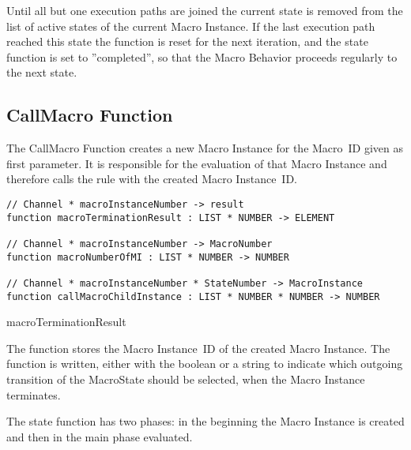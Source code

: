 Until all but one execution paths are joined the current state is removed from the list of active states of the current Macro Instance. If the last execution path reached this state the  function is reset for the next iteration, and the state function is set to ''completed'', so that the Macro Behavior proceeds regularly to the next state.


\subsection{CallMacro Function}


The CallMacro Function creates a new Macro Instance for the Macro~ID given as first parameter. It is responsible for the evaluation of that Macro Instance and therefore calls the  rule with the created Macro Instance~ID.


\begin{listing}[htbp]
\begin{verbatim}
// Channel * macroInstanceNumber -> result
function macroTerminationResult : LIST * NUMBER -> ELEMENT

// Channel * macroInstanceNumber -> MacroNumber
function macroNumberOfMI : LIST * NUMBER -> NUMBER

// Channel * macroInstanceNumber * StateNumber -> MacroInstance
function callMacroChildInstance : LIST * NUMBER * NUMBER -> NUMBER
\end{verbatim}
\caption{macroTerminationResult}
\label{lst:shortasm:macroTerminationResult}
\end{listing}



The  function stores the Macro Instance~ID of the created Macro Instance. The  function is written, either with the boolean  or a string to indicate which outgoing transition of the MacroState should be selected, when the Macro Instance terminates.

The state function has two phases: in the beginning the Macro Instance is created and then in the main phase evaluated.



